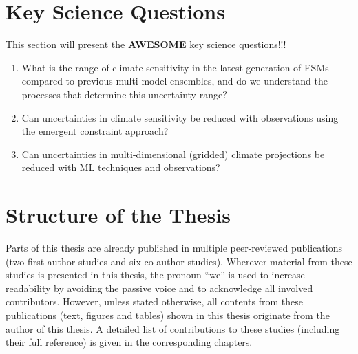 \section{Key Science Questions}
\label{sec:01:research_questions}

This section will present the \textbf{AWESOME} key science questions!!!

\begin{enumerate}
  \item What is the range of climate sensitivity in the latest generation of
  \acp{ESM} compared to previous multi-model ensembles, and do we understand
  the processes that determine this uncertainty range?

  \item Can uncertainties in climate sensitivity be reduced with observations
  using the emergent constraint approach?

  \item Can uncertainties in multi-dimensional (gridded) climate projections be
  reduced with \ac{ML} techniques and observations?
\end{enumerate}


\section{Structure of the Thesis}
\label{sec:01:structure}

Parts of this thesis are already published in multiple peer-reviewed
publications (two first-author studies and six co-author studies). Wherever
material from these studies is presented in this thesis, the pronoun
\enquote{we} is used to increase readability by avoiding the passive voice and
to acknowledge all involved contributors. However, unless stated otherwise, all
contents from these publications (text, figures and tables) shown in this
thesis originate from the author of this thesis. A detailed list of
contributions to these studies (including their full reference) is given in the
corresponding chapters.

